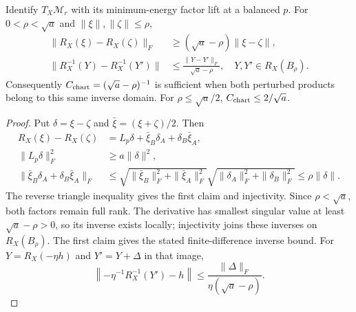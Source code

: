 \begin{lemma}
\label{lem:rigid-inverse-retraction}
Identify $T_X\mathcal M_r$ with its minimum-energy factor lift at a
balanced $p$. For $0<\rho<\sqrt a$ and $\|\xi\|,\|\zeta\|\leq\rho$,
\begin{align}
\|R_X(\xi)-R_X(\zeta)\|_F
&\geq(\sqrt a-\rho)\|\xi-\zeta\|,\\
\|R_X^{-1}(Y)-R_X^{-1}(Y')\|
&\leq\frac{\|Y-Y'\|_F}{\sqrt a-\rho},
\quad Y,Y'\in R_X(B_\rho).
\label{eq:rigid-inverse-retraction}
\end{align}
Consequently $C_{\rm chart}=(\sqrt a-\rho)^{-1}$ is sufficient
when both perturbed products belong to this same inverse domain.
For $\rho\leq\sqrt a/2$, $C_{\rm chart}\leq2/\sqrt a$.
\end{lemma}
\begin{proof}
Put $\delta=\xi-\zeta$ and $\bar\xi=(\xi+\zeta)/2$. Then
\begin{align}
R_X(\xi)-R_X(\zeta)
&=L_p\delta+\bar\xi_B\delta_A+\delta_B\bar\xi_A,\\
\|L_p\delta\|_F^2&\geq a\|\delta\|^2,\\
\|\bar\xi_B\delta_A+\delta_B\bar\xi_A\|_F
&\leq\sqrt{\|\bar\xi_B\|_F^2+\|\bar\xi_A\|_F^2}
\sqrt{\|\delta_A\|_F^2+\|\delta_B\|_F^2}
\leq\rho\|\delta\|.
\end{align}
The reverse triangle inequality gives the first claim and injectivity.
Since $\rho<\sqrt a$, both factors remain full rank. The derivative
has smallest singular value at least $\sqrt a-\rho>0$, so its inverse
exists locally; injectivity joins these inverses on $R_X(B_\rho)$.
The first claim gives the stated finite-difference inverse bound.
For $Y=R_X(-\eta h)$ and $Y'=Y+\Delta$ in that image,
\begin{equation}
\left\|-\eta^{-1}R_X^{-1}(Y')-h\right\|
\leq\frac{\|\Delta\|_F}{\eta(\sqrt a-\rho)}.
\end{equation}
\end{proof}

